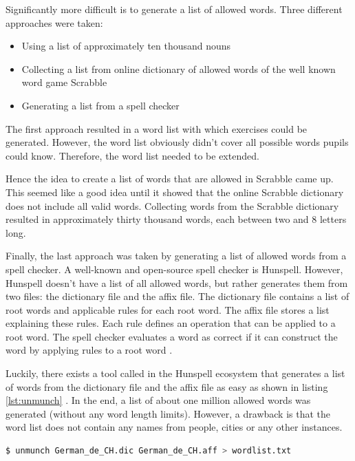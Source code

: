 Significantly more difficult is to generate a list of allowed words. Three different approaches were taken:

\begin{itemize}
  \item Using a list of approximately ten thousand nouns
  \item Collecting a list from online dictionary of allowed words of the well known word game Scrabble \cite{Scrabble}
  \item Generating a list from a spell checker
\end{itemize}

The first approach resulted in a word list with which exercises could be generated. However, the word list obviously didn't cover all possible words pupils could know. Therefore, the word list needed to be extended.

Hence the idea to create a list of words that are allowed in Scrabble came up. This seemed like a good idea until it showed that the online Scrabble dictionary does not include all valid words.
Collecting words from the Scrabble dictionary resulted in approximately thirty thousand words, each between two and 8 letters long.

Finally, the last approach was taken by generating a list of allowed words from a spell checker. A well-known and open-source spell checker is Hunspell. However, Hunspell doesn't have a list of all allowed words, but rather generates them from two files: the dictionary file and the affix file. The dictionary file contains a list of root words and applicable rules for each root word. The affix file stores a list explaining these rules. Each rule defines an operation that can be applied to a root word. The spell checker evaluates a word as correct if it can construct the word by applying rules to a root word \cite{Hunspell}.

Luckily, there exists a tool called  in the Hunspell ecosystem that generates a list of words from the dictionary file and the affix file as easy as shown in listing \ref{lst:unmunch} \cite{HunspellGithub}.
In the end, a list of about one million allowed words was generated (without any word length limits). However, a drawback is that the word list does not contain any names from people, cities or any other instances. 

\begin{lstlisting}[language=Bash,caption={Bash command to unmunch a dictionary file and a affix file to a list of words},label={lst:unmunch}]
$ unmunch German_de_CH.dic German_de_CH.aff > wordlist.txt
\end{lstlisting}

